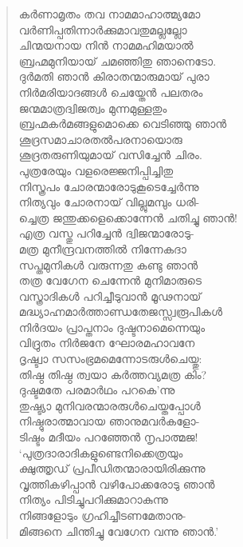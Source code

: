 \begin{verse}
കര്‍ണാമൃതം തവ നാമമാഹാത്മ്യമോ\\
വര്‍ണിപ്പതിന്നാര്‍ക്കുമാവതുമല്ലല്ലോ\\
ചിന്മയനായ നിന്‍ നാമമഹിമയാല്‍\\
ബ്രഹ്മമുനിയായ് ചമഞ്ഞിതു ഞാനെടോ.\\
ദുര്‍മതി ഞാന്‍ കിരാതന്മാരുമായ് പുരാ\\
നിര്‍മരിയാദങ്ങള്‍ ചെയ്തേന്‍ പലതരം\\
ജന്മമാത്രദ്വിജത്വം മുന്നമുള്ളതും\\
ബ്രഹ്മകര്‍മങ്ങളുമൊക്കെ വെടിഞ്ഞു ഞാന്‍\\
ശൂദ്രസമാചാരതല്‍പരനായൊരു\\
ശൂദ്രതരുണിയുമായ് വസിച്ചേന്‍ ചിരം.\\
പുത്രരേയും വളരെജ്ജനിപ്പിച്ചിതു\\
നിസ്ത്രപം ചോരന്മാരോടുകൂടെച്ചേര്‍ന്നു\\
നിത്യവും ചോരനായ് വില്ലുമമ്പും ധരി-\\
ച്ചെത്ര ജന്തുക്കളെക്കൊന്നേന്‍ ചതിച്ചു ഞാന്‍!\\
എത്ര വസ്തു പറിച്ചേന്‍ ദ്വിജന്മാരോടു-\\
മത്ര മുനീന്ദ്രവനത്തില്‍ നിന്നേകദാ\\
സപ്തമുനികള്‍ വരുന്നതു കണ്ടു ഞാന്‍\\
തത്ര വേഗേന ചെന്നേന്‍ മുനിമാരുടെ\\
വസ്ത്രാദികള്‍ പറിച്ചീടുവാന്‍ മൂഢനായ്\\
മദ്ധ്യാഹ്നമാര്‍ത്താണ്ഡതേജസ്സ്വരൂപികള്‍\\
നിര്‍ദയം പ്രാപ്തനാം ദുഷ്ടനാമെന്നെയും\\
വിദ്രുതം നിര്‍ജനേ ഘോരമഹാവനേ\\
ദൃഷ്ട്വാ സസംഭ്രമമെന്നോടരുള്‍ചെയ്തു:\\
തിഷ്ഠ തിഷ്ഠ ത്വയാ കര്‍ത്തവ്യമത്ര കിം?\\
ദുഷ്ടമതേ പരമാര്‍ഥം പറകെ’ന്നു\\
തുഷ്ട്യാ മുനിവരന്മാരരുള്‍ചെയ്തപ്പോള്‍\\
നിഷ്ഠുരാത്മാവായ ഞാനുമവര്‍കളോ-\\
ടിഷ്ടം മദീയം പറഞ്ഞേന്‍ നൃപാത്മജ!\\
‘പുത്രദാരാദികളുണ്ടെനിക്കെത്രയും\\
ക്ഷുത്തൃഡ് പ്രപീഡിതന്മാരായിരിക്കുന്നു\\
വൃത്തികഴിപ്പാന്‍ വഴിപോക്കരോടു ഞാന്‍\\
നിത്യം പിടിച്ചുപറിക്കുമാറാകുന്നു\\
നിങ്ങളോടും ഗ്രഹിച്ചീടണമേതാനു-\\
മിങ്ങനെ ചിന്തിച്ചു വേഗേന വന്നു ഞാന്‍.‍’\\

\end{verse}
